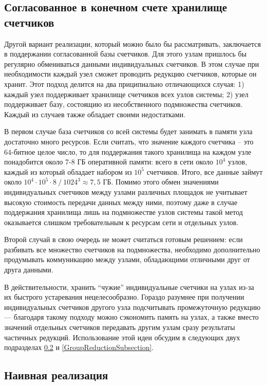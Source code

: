 \documentclass{article}
\theoremstyle{plain}
\theoremstyle{plain}
\theoremstyle{plain}
\theoremstyle{plain}
\theoremstyle{definition}
\theoremstyle{remark}
\theoremstyle{plain}
\begin{document}
\subsection{Согласованное в конечном счете хранилище счетчиков}

Другой вариант реализации, который можно было бы рассматривать, заключается в поддержании согласованной базы счетчиков. Для этого узлам пришлось бы регулярно обмениваться данными индивидуальных счетчиков. В этом случае при необходимости каждый узел сможет проводить редукцию счетчиков, которые он хранит. Этот подход делится на два приципиально отличающихся случая: 1) каждый узел поддерживает хранилище счетчиков всех узлов системы; 2) узел поддерживает базу, состоящию из несобственного подмножества счетчиков. Каждый из случаев также обладает своими недостатками.

В первом случае база счетчиков со всей системы будет занимать в памяти узла достаточно много ресурсов. Если считать, что значение каждого счетчика -- это 64-битное целое число, то для поддержания такого хранилища на каждом узле понадобится около 7-8 ГБ оперативной памяти: всего в сети около $10^4$ узлов, каждый из который обладает набором из $10^5$ счетчиков. Итого, все данные займут около $10^4 \cdot 10^5 \cdot 8\ /\ 1024^3 \approx 7,5$ ГБ. Помимо этого обмен значениями индивидуальных счетчиков между узлами различных площадок не учитывает высокую стоимость передачи данных между ними, поэтому даже в случае поддержания хранилища лишь на подмножестве узлов системы такой метод оказывается слишком требовательным к ресурсам сети и отдельных узлов.

Второй случай в свою очередь не может считаться готовым решением: если разбивать все множество счетчиков на подмножества, необходимо дополнительно продумывать коммуникацию между узлами, обладающими отличными друг от друга данными.

В действительности, хранить \enquote{чужие} индивидуальные счетчики на узлах из-за их быстрого устаревания нецелесообразно. Гораздо разумнее при получении индивидуальных счетчиков другого узла подсчитывать промежуточную редукцию --- благодаря такому подходу можно сэкономить память на узлах, а также вместо значений отдельных счетчиков передавать другим узлам сразу результаты частичных редукций. Использование этой идеи обсудим в следующих двух подразделах \ref{NaiveImplementationSubsection} и \ref{GroupReductionSubsection}.

\subsection{Наивная реализация}
\label{NaiveImplementationSubsection}
\end{document}
